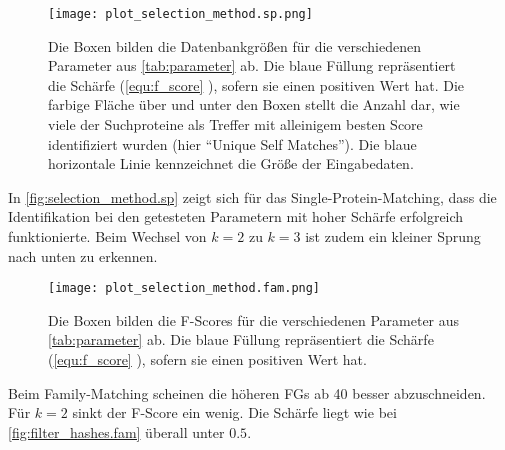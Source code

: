         \begin{figure}[H]
            \centering
            \texttt{[image: plot\_selection\_method.sp.png]}
            \caption[Single-Protein-Matching ]{Die Boxen bilden die Datenbankgrößen für die verschiedenen Parameter aus \autoref{tab:parameter} ab. Die blaue Füllung repräsentiert die Schärfe (\autoref{equ:f_score} ), sofern sie einen positiven Wert hat. Die farbige Fläche über und unter den Boxen stellt die Anzahl dar, wie viele der Suchproteine als Treffer mit alleinigem besten Score identifiziert wurden (hier ``Unique Self Matches''). Die blaue horizontale Linie kennzeichnet die Größe der Eingabedaten.}
            \label{fig:selection_method.sp}
        \end{figure}

        In \autoref{fig:selection_method.sp} zeigt sich für das Single-Protein-Matching, dass die Identifikation bei den getesteten Parametern mit hoher Schärfe erfolgreich funktionierte. Beim Wechsel von $k=2$ zu $k=3$ ist zudem ein kleiner Sprung nach unten zu erkennen.

        \begin{figure}[H]
            \centering
            \texttt{[image: plot\_selection\_method.fam.png]}
            \caption[Family-Matching ]{Die Boxen bilden die F-Scores für die verschiedenen Parameter aus \autoref{tab:parameter} ab. Die blaue Füllung repräsentiert die Schärfe (\autoref{equ:f_score} ), sofern sie einen positiven Wert hat.}
            \label{fig:selection_method.fam}
        \end{figure}

        Beim Family-Matching scheinen die höheren \acp{FG} ab 40 besser abzuschneiden. Für $k=2$ sinkt der F-Score ein wenig. Die Schärfe liegt wie bei \autoref{fig:filter_hashes.fam} überall unter $0.5$.
